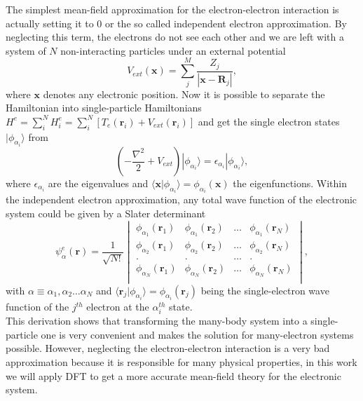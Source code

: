 The simplest mean-field approximation for the electron-electron interaction is actually setting it to $0$ or the so called independent electron approximation. By neglecting this term, the electrons do not see each other and we are 
left with a system of $N$ non-interacting particles under an external potential
\begin{equation}
 V_{ext}(\mathbf{x})=\sum_{j}^{M}\frac{Z_{j}}{|\mathbf{x}-\mathbf{R}_{j}|},
\end{equation}
where $\mathbf{x}$ denotes any electronic position. Now it is possible to separate the Hamiltonian into single-particle Hamiltonians $H^{e}=\sum_{i}^{N}H_{i}^{e}=\sum_{i}^{N}[T_{e}(\mathbf{r}_{i})+V_{ext}(\mathbf{r}_{i})]$ and get 
the single electron states $|\phi_{\alpha_{i}}\rangle$ from
\begin{equation}
\label{independent-electron}
 \left(-\frac{\nabla^{2}}{2}+V_{ext}\right)|\phi_{\alpha_{i}}\rangle=\epsilon_{\alpha_{i}}|\phi_{\alpha_{i}}\rangle,
\end{equation}
where $\epsilon_{\alpha_{i}}$ are the eigenvalues and $\langle\mathbf{x}|\phi_{\alpha_{i}}\rangle=\phi_{\alpha_{i}}(\mathbf{x})$ the eigenfunctions. Within the independent electron approximation, any total wave function of the 
electronic system could be given by a Slater determinant\cite{slater1930note}
\begin{equation}
\label{slater}
 \psi_{\alpha}^{e}(\mathbf{r})=\frac{1}{\sqrt{N!}}
 \begin{vmatrix}
  \phi_{\alpha_{1}}(\mathbf{r}_{1}) & \phi_{\alpha_{1}}(\mathbf{r}_{2}) & \dots & \phi_{\alpha_{1}}(\mathbf{r}_{N}) \\
  \phi_{\alpha_{2}}(\mathbf{r}_{1}) & \phi_{\alpha_{2}}(\mathbf{r}_{2}) & \dots & \phi_{\alpha_{2}}(\mathbf{r}_{N}) \\
  . & . & \dots & . \\
  \phi_{\alpha_{N}}(\mathbf{r}_{1}) & \phi_{\alpha_{N}}(\mathbf{r}_{2}) & \dots & \phi_{\alpha_{N}}(\mathbf{r}_{N}) \\
 \end{vmatrix}
 ,
\end{equation}
with $\alpha\equiv\alpha_{1},\alpha_{2}\dots\alpha_{N}$ and $\langle\mathbf{r}_{j}|\phi_{\alpha_{i}}\rangle=\phi_{\alpha_{i}}(\mathbf{r}_{j})$ being the single-electron wave function of the $j^{th}$ electron at the 
$\alpha_{i}^{th}$ state. \\

This derivation shows that transforming the many-body system into a single-particle one is very convenient and makes the solution for many-electron systems possible. However, neglecting the electron-electron interaction 
is a very bad approximation\cite{ashcroft1976solid} because it is responsible for many physical properties, in this work we will apply DFT to get a more accurate mean-field theory for the electronic system.

